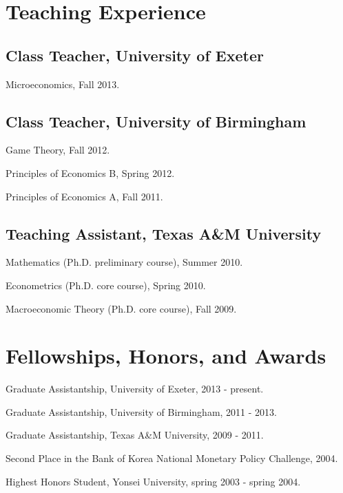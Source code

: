 \documentclass[letterpaper,11pt]{article}
\renewenvironment{itemize}{
\begin{list}{}{
\setlength{\leftmargin}{1.5em}
}
}{
\end{list}
}
\begin{document}

\section*{Teaching Experience}
\subsection*{Class Teacher, University of Exeter}
\begin{itemize}
\item Microeconomics, Fall 2013.
\end{itemize}
\subsection*{Class Teacher, University of Birmingham}
\begin{itemize}
\item Game Theory, Fall 2012.
\item Principles of Economics B, Spring 2012.
\item Principles of Economics A, Fall 2011.
\end{itemize}
\subsection*{Teaching Assistant, Texas A\&M University}
\begin{itemize}
\item Mathematics (Ph.D. preliminary course), Summer 2010.
\item Econometrics (Ph.D. core course), Spring 2010.
\item Macroeconomic Theory (Ph.D. core course), Fall 2009.
\end{itemize}


\section*{Fellowships, Honors, and Awards}
\begin{itemize}
\item Graduate Assistantship, University of Exeter, 2013 - present.
\item Graduate Assistantship, University of Birmingham, 2011 - 2013.
\item Graduate Assistantship, Texas A\&M University, 2009 - 2011.
\item Second Place in the Bank of Korea National Monetary Policy Challenge, 2004.
\item Highest Honors Student, Yonsei University, spring 2003 - spring 2004.
\end{itemize}
\end{document}
